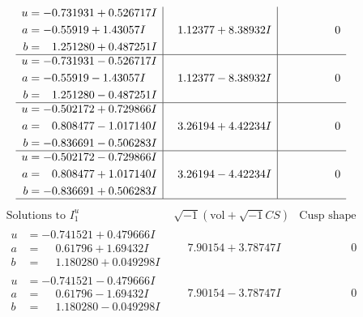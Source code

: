 \documentclass[1p]{elsarticle_modified}
\theoremstyle{definition}
\newcommand{\I}{\sqrt{-1}}
\begin{document}
$$\begin{array}{c|c|c}
\begin{aligned}
u &= -0.731931 + 0.526717 I \\
a &= -0.55919 + 1.43057 I \\
b &= \phantom{-}1.251280 + 0.487251 I\end{aligned}
 & \phantom{-}1.12377 + 8.38932 I & \phantom{-0.000000 } 0 \\ \hline\begin{aligned}
u &= -0.731931 - 0.526717 I \\
a &= -0.55919 - 1.43057 I \\
b &= \phantom{-}1.251280 - 0.487251 I\end{aligned}
 & \phantom{-}1.12377 - 8.38932 I & \phantom{-0.000000 } 0 \\ \hline\begin{aligned}
u &= -0.502172 + 0.729866 I \\
a &= \phantom{-}0.808477 - 1.017140 I \\
b &= -0.836691 - 0.506283 I\end{aligned}
 & \phantom{-}3.26194 + 4.42234 I & \phantom{-0.000000 } 0 \\ \hline\begin{aligned}
u &= -0.502172 - 0.729866 I \\
a &= \phantom{-}0.808477 + 1.017140 I \\
b &= -0.836691 + 0.506283 I\end{aligned}
 & \phantom{-}3.26194 - 4.42234 I & \phantom{-0.000000 } 0\\
 \hline 
 \end{array}$$\newpage$$\begin{array}{c|c|c}  
\text{Solutions to }I^u_{1}& \I (\text{vol} + \sqrt{-1}CS) & \text{Cusp shape}\\
 \hline 
\begin{aligned}
u &= -0.741521 + 0.479666 I \\
a &= \phantom{-}0.61796 + 1.69432 I \\
b &= \phantom{-}1.180280 + 0.049298 I\end{aligned}
 & \phantom{-}7.90154 + 3.78747 I & \phantom{-0.000000 } 0 \\ \hline\begin{aligned}
u &= -0.741521 - 0.479666 I \\
a &= \phantom{-}0.61796 - 1.69432 I \\
b &= \phantom{-}1.180280 - 0.049298 I\end{aligned}
 & \phantom{-}7.90154 - 3.78747 I & \phantom{-0.000000 } 0 \\ \hline\begin{aligned}

\end{aligned}
\end{array}$$
\end{document}

